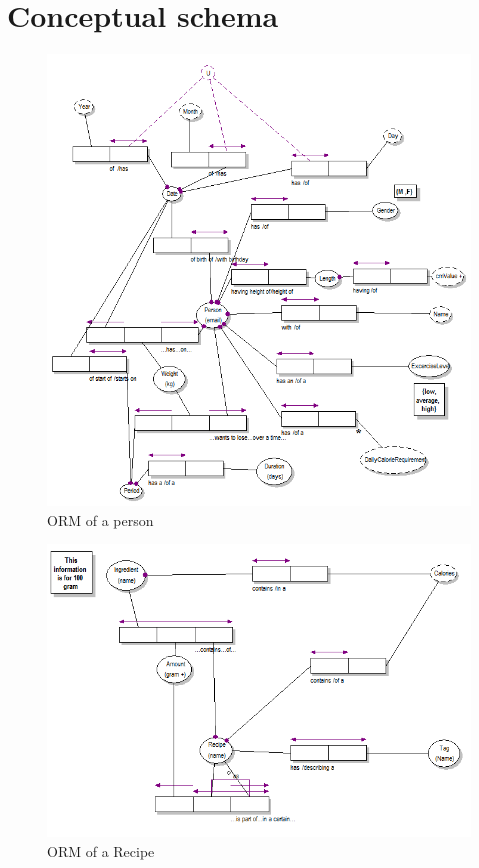 \section{Conceptual schema}
  \begin{figure} [h!]
     \includegraphics[width = 1.3\textwidth]{image/Person} 
     \caption{ORM of a person}
     \label{fig:twotier}
  \end{figure}
  \begin{figure} [h!]
     \includegraphics[width = 1.3\textwidth]{image/Recipe} 
     \caption{ORM of a Recipe}
     \label{fig:twotier}
  \end{figure}
\newpage

